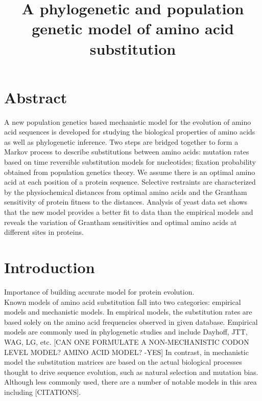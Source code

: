 \documentclass[13pt]{article}
\title{A phylogenetic and population genetic model of amino acid substitution}
\author{}
\begin{document}
\maketitle
\section{Abstract}
A new population genetics based mechanistic model for the evolution of amino acid sequences is developed for studying the biological properties of amino acids as well as phylogenetic inference.
Two steps are bridged together to form a Markov process to describe substitutions between amino acids: mutation rates based on time reversible substitution models for nucleotides; fixation probability obtained from population genetics theory. 
We assume there is an optimal amino acid at each position of a protein sequence. 
Selective restraints are characterized by the physiochemical distances from optimal amino acids and the Grantham sensitivity of protein fitness to the distances. 
Analysis of yeast data set shows that the new model provides a better fit to data than the empirical models and reveals the variation of Grantham sensitivities and optimal amino acids at different sites in proteins.\\

\section{Introduction}
Importance of building accurate model for protein evolution. \\

Known models of amino acid substitution fall into two categories: empirical models and mechanistic models. 
In empirical models, the substitution rates are based solely on the amino acid frequencies observed in given database.
Empirical models are commonly used in phylogenetic studies and include  Dayhoff, JTT, WAG, LG, etc. 
[CAN ONE FORMULATE A NON-MECHANISTIC CODON LEVEL MODEL? AMINO ACID MODEL?  -YES]
In contrast, in mechanistic model the substitution matrices are based on the actual biological processes thought to drive sequence evolution, such as natural selection and mutation bias.
Although less commonly used, there are a number of notable models in this area including [CITATIONS].
\end{document}
